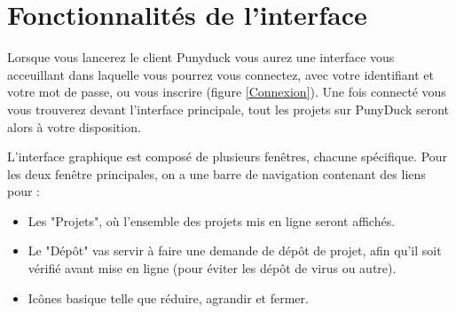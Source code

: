 \documentclass{report}
\begin{document}
\begin{center}
\end{center}

\section{Fonctionnalités de l'interface}
Lorsque vous lancerez le client Punyduck vous aurez une interface vous acceuillant dans laquelle vous pourrez vous connectez, avec votre identifiant et votre mot de passe, ou vous inscrire (figure \ref{Connexion}). Une fois connecté vous vous trouverez devant l’interface principale, tout les projets sur PunyDuck seront alors à votre disposition.

L'interface graphique est composé de plusieurs fenêtres, chacune spécifique. Pour les deux fenêtre principales, on a une barre de navigation contenant des liens pour :
\vspace{0.5cm}
\begin{itemize}
    \item Les "Projets", où l'ensemble des projets mis en ligne seront affichés. 
    \item Le "Dépôt" vas servir à faire une demande de dépôt de projet, afin qu'il soit vérifié avant mise en ligne (pour éviter les dépôt de virus ou autre).
    \item Icônes basique telle que réduire, agrandir et fermer.
\end{itemize}
\vspace{0.5cm}
\end{document}
